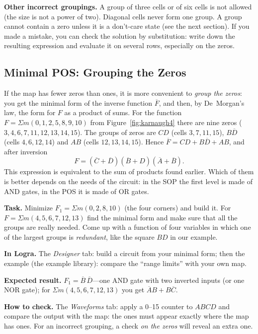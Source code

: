 \textbf{Other incorrect groupings.} A group of three cells or of six cells is
not allowed (the size is not a power of two). Diagonal cells never form one
group. A group cannot contain a zero unless it is a don't-care state (see the
next section). If you made a mistake, you can check the solution by
substitution: write down the resulting expression and evaluate it on several
rows, especially on the zeros.

\subsection{Minimal POS: Grouping the Zeros}

If the map has fewer zeros than ones, it is more convenient to \emph{group the
zeros}: you get the minimal form of the inverse function $\overline{F}$, and
then, by De~Morgan's law, the form for $F$ as a product of sums. For the
function $F=\Sigma m(0,1,2,5,8,9,10)$ from Figure~\ref{fig:karnaugh4} there are
nine zeros ($3,4,6,7,11,12,13,14,15$). The groups of zeros are $CD$ (cells
$3,7,11,15$), $B\overline{D}$ (cells $4,6,12,14$) and $AB$ (cells
$12,13,14,15$). Hence $\overline{F}=CD+B\overline{D}+AB$, and after
inversion
\[
  F=(\overline{C}+\overline{D})(\overline{B}+D)(\overline{A}+\overline{B}).
\]
This expression is equivalent to the sum of products found earlier. Which of
them is better depends on the needs of the circuit: in the SOP the first level
is made of AND gates, in the POS it is made of OR gates.

\begin{diybox}
\textbf{Task.}  Minimize $F_1=\Sigma m(0,2,8,10)$ (the four
corners) and build it.  For $F=\Sigma m(4,5,6,7,12,13)$ find the
minimal form and make sure that all the groups are really needed.
 Come up with a function of four variables in which one of the
largest groups is \emph{redundant}, like the square $BD$ in our example.

\textbf{In Logra.} The \emph{Designer} tab: build a circuit from your
minimal form; then the example  (the example library):
compare the ``range limits'' with your own map.

\textbf{Expected result.} $F_1=\overline{B}\,\overline{D}$---one AND gate with
two inverted inputs (or one NOR gate); for $\Sigma m(4,5,6,7,12,13)$ you get
$\overline{A}B+B\overline{C}$.

\textbf{How to check.} The \emph{Waveforms} tab: apply a 0--15 counter to
$ABCD$ and compare the output with the map: the ones must appear exactly
where the map has ones. For an incorrect grouping, a check \emph{on the zeros}
will reveal an extra one.
\end{diybox}

